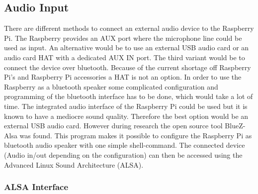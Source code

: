 \subsection{Audio Input}\label{sec:software:rec}
%
There are different methods to connect an external audio device to the Raspberry Pi. The Raspberry provides an AUX port where the microphone line could be used as input. An alternative would be to use an external USB audio card or an audio card HAT with a dedicated AUX IN port. The third variant would be to connect the device over bluetooth.\p
%
Because of the current shortage off Raspberry Pi's and Raspberry Pi accessories a HAT is not an option. In order to use the Raspberry as a bluetooth speaker some complicated configuration and programming of the bluetooth interface has to be done, which would take a lot of time. The integrated audio interface of the Raspberry Pi could be used but it is known to have a mediocre sound quality. Therefore the best option would be an external USB audio card. However during research the open source tool BlueZ-Alsa\cite{bokowy_bluez-alsa_2022} was found. This program makes it possible to configure the Raspberry Pi as bluetooth audio speaker with one simple shell-command. The connected device (Audio in/out depending on the configuration) can then be accessed using the Advanced Linux Sound Architecture (ALSA).
%
\subsubsection*{ALSA Interface}


